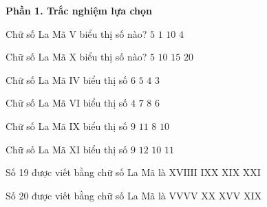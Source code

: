 \textbf{Phần 1. Trắc nghiệm lựa chọn}

\begin{ex} %
Chữ số La Mã $\text{V}$ biểu thị số nào?
\choice
{\True $5$}
{$1$}
{$10$}
{$4$}
\end{ex}

\begin{ex} %
Chữ số La Mã $\text{X}$ biểu thị số nào?
\choice
{$5$}
{\True $10$}
{$15$}
{$20$}
\end{ex}

\begin{ex} %
Chữ số La Mã $\text{IV}$ biểu thị số
\choice
{$6$}
{$5$}
{\True $4$}
{$3$}
\end{ex}

\begin{ex} %
Chữ số La Mã $\text{VI}$ biểu thị số
\choice
{$4$}
{$7$}
{$8$}
{\True $6$}
\end{ex}

\begin{ex} %
Chữ số La Mã $\text{IX}$ biểu thị số
\choice
{\True $9$}
{$11$}
{$8$}
{$10$}
\end{ex}

\begin{ex} %
Chữ số La Mã $\text{XI}$ biểu thị số
\choice
{$9$}
{$12$}
{$10$}
{\True $11$}
\end{ex}

\begin{ex} %
Số 19 được viết bằng chữ số La Mã là
\choice
{$\text{XVIIII}$}
{$\text{IXX}$}
{\True $\text{XIX}$}
{$\text{XXI}$}
\end{ex}

\begin{ex} %
Số 20 được viết bằng chữ số La Mã là
\choice
{$\text{VVVV}$}
{\True $\text{XX}$}
{$\text{XVV}$}
{$\text{XIX}$}
\end{ex}

